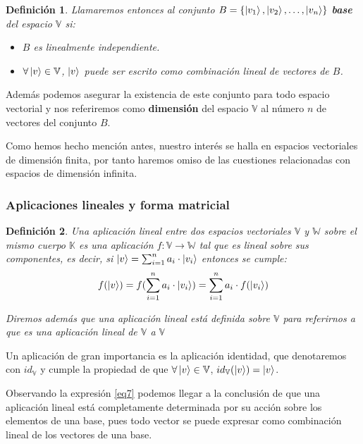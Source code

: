 \documentclass[a4paper]{article}
\newtheorem{deff}{Definición}[section]
\numberwithin{equation}{section}
\begin{document}
\begin{deff} Llamaremos entonces al conjunto $B = \{ \ket{v_1},\ket{v_2}, \ldots, \ket{v_n} \}$ \textbf{base} del espacio $\mathbb{V}$ si:
\begin{itemize}
\item $B$ es linealmente independiente.

\item $\forall \ket{v} \in \mathbb{V}$, $\ket{v}$ puede ser escrito como combinación lineal de vectores de $B$.
\end{itemize}
\end{deff}

Además podemos asegurar la existencia de este conjunto para todo espacio vectorial y  nos referiremos como \textbf{dimensión} del espacio $\mathbb{V}$ al número $n$ de vectores del conjunto $B$.

Como hemos hecho mención antes, nuestro interés se halla en espacios vectoriales de dimensión finita, por tanto haremos omiso de las cuestiones relacionadas con espacios de dimensión infinita.

\subsubsection{Aplicaciones lineales y forma matricial}

\begin{deff} Una aplicación lineal entre dos espacios vectoriales $\mathbb{V}$ y $\mathbb{W}$ sobre el mismo cuerpo $\mathbb{K}$ es una aplicación $f: \mathbb{V} \longrightarrow \mathbb{W}$ tal que es lineal sobre sus componentes, es decir, si $\ket{v} = \sum_{i=1}^n a_i \cdot \ket{v_i}$ entonces se cumple:
\begin{equation} \label{eq7}
f(\ket{v}) = f(\sum_{i=1}^n a_i \cdot \ket{v_i}) = \sum_{i=1}^n a_i \cdot f(\ket{v_i})
\end{equation}

Diremos además que una aplicación lineal está definida sobre $\mathbb{V}$ para referirnos a que es una aplicación lineal de $\mathbb{V}$ a $\mathbb{V}$
\end{deff}

Un aplicación de gran importancia es la aplicación identidad, que denotaremos con $id_{\mathbb{V}}$ y cumple la propiedad de que $\forall \ket{v}\in\mathbb{V}$, $id_{\mathbb{V}}(\ket{v}) = \ket{v}$.

Observando la expresión \ref{eq7} podemos llegar a la conclusión de que una aplicación lineal está completamente determinada por su acción sobre los elementos de una base, pues todo vector se puede expresar como combinación lineal de los vectores de una base.
\end{document}

